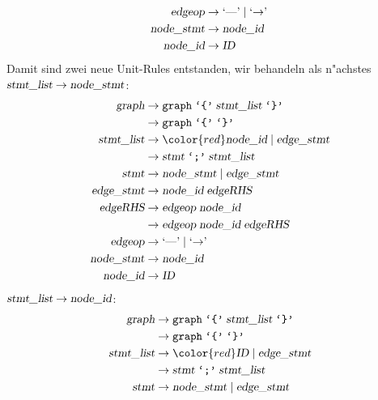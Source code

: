 \begin{loesung}
\begin{teilaufgaben}
\begin{align*}
\textsl{edgeop}    &\rightarrow \textrm{`\text{---}'}\; |\; \textrm{`$\rightarrow$'}\; \\
\textsl{node\_stmt}&\rightarrow \textsl{node\_id} \\
\textsl{node\_id}  &\rightarrow \textsl{ID}
\end{align*}
Damit sind zwei neue Unit-Rules entstanden, wir behandeln als n"achstes
$\textsl{stmt\_list}\to\textsl{node\_stmt}$:
\begin{align*}
\textsl{graph}     &\rightarrow \texttt{graph}\; \texttt{`\{'}\; \textsl{stmt\_list}\; \texttt{`\}'} \\
                   &\rightarrow \texttt{graph}\; \texttt{`\{'}\; \texttt{`\}'} \\
\textsl{stmt\_list}&\rightarrow {\color{red}\textsl{node\_id}}\; |\;
                                \textsl{edge\_stmt} \\
                   &\rightarrow \textsl{stmt}\; \texttt{`;'}\; \textsl{stmt\_list}\\
\textsl{stmt}      &\rightarrow \textsl{node\_stmt}\; |\;
                                \textsl{edge\_stmt} \\
\textsl{edge\_stmt}&\rightarrow \textsl{node\_id}\; \textsl{edgeRHS} \\
\textsl{edgeRHS}   &\rightarrow \textsl{edgeop}\; \textsl{node\_id}\\
                   &\rightarrow \textsl{edgeop}\; \textsl{node\_id}\; \textsl{edgeRHS}\\
\textsl{edgeop}    &\rightarrow \textrm{`\text{---}'}\; |\; \textrm{`$\rightarrow$'}\; \\
\textsl{node\_stmt}&\rightarrow \textsl{node\_id} \\
\textsl{node\_id}  &\rightarrow \textsl{ID}
\end{align*}
$\textsl{stmt\_list}\to\textsl{node\_id}$:
\begin{align*}
\textsl{graph}     &\rightarrow \texttt{graph}\; \texttt{`\{'}\; \textsl{stmt\_list}\; \texttt{`\}'} \\
                   &\rightarrow \texttt{graph}\; \texttt{`\{'}\; \texttt{`\}'} \\
\textsl{stmt\_list}&\rightarrow {\color{red}\textsl{ID}}\; |\;
                                \textsl{edge\_stmt} \\
                   &\rightarrow \textsl{stmt}\; \texttt{`;'}\; \textsl{stmt\_list}\\
\textsl{stmt}      &\rightarrow \textsl{node\_stmt}\; |\;
                                \textsl{edge\_stmt} \\

\end{align*}
\end{teilaufgaben}
\end{loesung}
